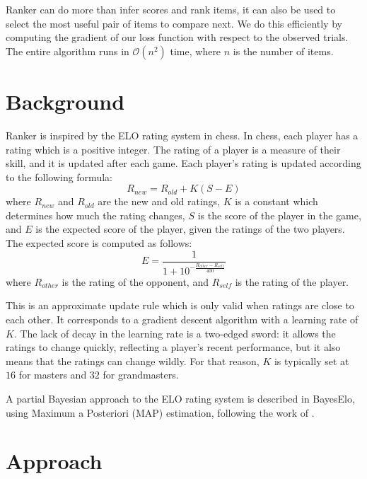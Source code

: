 \documentclass[12pt]{article}
\begin{document}
    Ranker can do more than infer scores and rank items, it can also be used to select the
    most useful pair of items to compare next. We do this efficiently by computing the
    gradient of our loss function with respect to the observed trials. The entire algorithm
    runs in $\mathcal{O}(n^2)$ time, where $n$ is the number of items.

\section{Background}
    Ranker is inspired by the ELO rating system in chess. In chess, each player has a rating
    which is a positive integer. The rating of a player is a measure of their skill,
    and it is updated after each game. Each player's rating is updated according to the
    following formula:
    \begin{equation}
        R_{new} = R_{old} + K(S - E)
    \end{equation}
    where $R_{new}$ and $R_{old}$ are the new and old ratings, $K$ is a constant which
    determines how much the rating changes, $S$ is the score of the player in the game, and
    $E$ is the expected score of the player, given the ratings of the two players. The expected
    score is computed as follows:
    \begin{equation}
        E = \frac{1}{1 + 10^{-\frac{R_{other} - R_{self}}{400}}}
    \end{equation}
    where $R_{other}$ is the rating of the opponent, and $R_{self}$ is the rating of the player.

    This is an approximate update rule which is only valid when ratings are close to each other.
    It corresponds to a gradient descent algorithm with a learning rate of $K$. The lack of decay
    in the learning rate is a two-edged sword: it allows the ratings to change quickly, reflecting
    a player's recent performance, but it also means that the ratings can change wildly. For that
    reason, $K$ is typically set at $16$ for masters and $32$ for grandmasters.

    A partial Bayesian approach to the ELO rating system is described in BayesElo, using
    Maximum a Posteriori (MAP) estimation, following the work of \cite{10.1214/aos/1079120141}.

\section{Approach}
\end{document}
